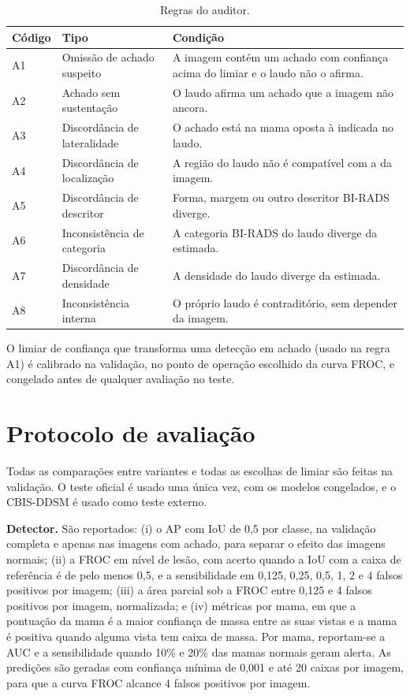 \begin{table}[htb]
  \centering
  \caption{Regras do auditor.}
  \label{tab:regras}
  \small
  \begin{tabular}{@{}lp{4.3cm}p{8cm}@{}}
    \toprule
    Código & Tipo & Condição \\
    \midrule
    A1 & Omissão de achado suspeito & A imagem contém um achado com confiança acima do limiar e o laudo não o afirma. \\
    A2 & Achado sem sustentação & O laudo afirma um achado que a imagem não ancora. \\
    A3 & Discordância de lateralidade & O achado está na mama oposta à indicada no laudo. \\
    A4 & Discordância de localização & A região do laudo não é compatível com a da imagem. \\
    A5 & Discordância de descritor & Forma, margem ou outro descritor BI-RADS diverge. \\
    A6 & Inconsistência de categoria & A categoria BI-RADS do laudo diverge da estimada. \\
    A7 & Discordância de densidade & A densidade do laudo diverge da estimada. \\
    A8 & Inconsistência interna & O próprio laudo é contraditório, sem depender da imagem. \\
    \bottomrule
  \end{tabular}
\end{table}

O limiar de confiança que transforma uma detecção em achado (usado na regra A1) é calibrado na validação, no ponto de operação escolhido da curva FROC, e congelado antes de qualquer avaliação no teste. 

\section{Protocolo de avaliação}

Todas as comparações entre variantes e todas as escolhas de limiar são feitas na validação. O teste oficial é usado uma única vez, com os modelos congelados, e o CBIS-DDSM é usado como teste externo.

\textbf{Detector.} São reportados: (i) o AP com IoU de 0,5 por classe, na validação completa e apenas nas imagens com achado, para separar o efeito das imagens normais; (ii) a FROC em nível de lesão, com acerto quando a IoU com a caixa de referência é de pelo menos 0,5, e a sensibilidade em 0,125, 0,25, 0,5, 1, 2 e 4 falsos positivos por imagem; (iii) a área parcial sob a FROC entre 0,125 e 4 falsos positivos por imagem, normalizada; e (iv) métricas por mama, em que a pontuação da mama é a maior confiança de massa entre as suas vistas e a mama é positiva quando alguma vista tem caixa de massa. Por mama, reportam-se a AUC e a sensibilidade quando 10\% e 20\% das mamas normais geram alerta. As predições são geradas com confiança mínima de 0,001 e até 20 caixas por imagem, para que a curva FROC alcance 4 falsos positivos por imagem.

